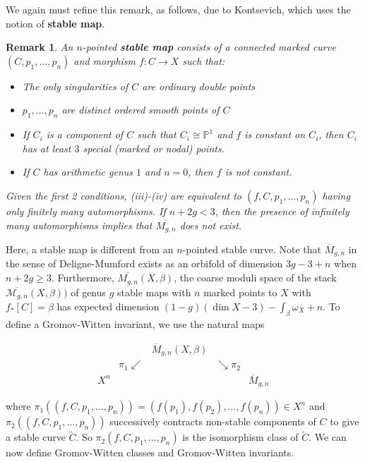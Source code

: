 \documentclass{amsart}
\newtheorem{remark}[theorem]{Remark}
\newcommand{\PP}{\mathbb{P}}\newcommand{\A}{\mathbb{A}}\newcommand{\Z}{\mathbb{Z}}\newcommand{\C}{\mathbb{C}}\newcommand{\N}{\mathbb{N}}\newcommand{\T}{\mathbb{T}}
\begin{document}
We again must refine this remark, as follows, due to Kontsevich, which uses the notion of \textbf{stable map}. 

\begin{remark} An $n$-pointed \textbf{stable map} consists of a connected marked curve $(C,p_1, \dots, p_n)$ and morphism $f:C \rightarrow X$ such that: 
\begin{itemize}
    \item[(i)] The only singularities of $C$ are ordinary double points \\
    \item[(ii)] $p_1, \dots, p_n$ are distinct ordered smooth points of $C$ \\
    \item[(iii)] If $C_i$ is a component of $C$ such that $C_i \cong \PP^1$ and $f$ is constant on $C_i$, then $C_i$ has at least $3$ special (marked or nodal) points. 
    \item[(iv)] If $C$ has arithmetic genus $1$ and $n=0$, then $f$ is not constant. 
\end{itemize}

Given the first 2 conditions, (iii)-(iv) are equivalent to $(f,C,p_1,\dots, p_n)$ having only finitely many automorphisms. If $n+2g<3$, then the presence of infinitely many automorphisms implies that $\overline{M_{g,n}}$ does not exist. 
\end{remark} 

Here, a stable map is different from an $n$-pointed stable curve. Note that $\overline{M}_{g,n}$ in the sense of Deligne-Mumford exists as an orbifold of dimension $3g-3+n$ when $n+2g\geq 3$. Furthermore, $\overline{M_{g,n}}(X,\beta)$, the coarse moduli space of the stack $\overline{\mathcal{M}_{g,n}}(X,\beta))$ of genus $g$ stable maps with $n$ marked points to $X$ with $f_*[C]=\beta$ has expected dimension $(1-g)(\dim X - 3)-\int_\beta \omega_X + n$. To define a Gromov-Witten invariant, we use the natural maps

\[\begin{array}{ccccc}
 & & \overline{M}_{g,n}(X,\beta) & & \\
 & \pi_1 \swarrow  & &  \searrow \pi_2 &  \\
 X^n & & & & \overline{M}_{g,n} 
\end{array}\]

where $\pi_1( (f,C,p_1, \dots, p_n)) = (f(p_1),f(p_2),\dots, f(p_n))\in X^n$ and $\pi_2( (f,C,p_1, \dots, p_n)  )$ successively contracts non-stable components of $C$ to give a stable curve $\tilde{C}$. So $\pi_2(f,C,p_1, \dots, p_n)$ is the isomorphism class of $\tilde{C}$. We can now define Gromov-Witten classes and Gromov-Witten invariants.
\end{document}
